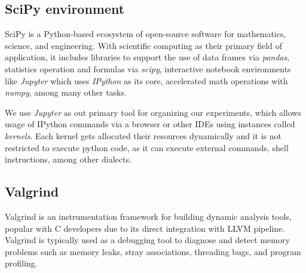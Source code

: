 \subsection{SciPy environment}
SciPy is a Python-based ecosystem of open-source software for mathematics, science, and engineering. With scientific computing as their primary field of application, it includes libraries to support the use of data frames via \textit{pandas}, statistics operation and formulas via \textit{scipy}, interactive notebook environments like \textit{Jupyter} which uses \textit{IPython} as its core, accelerated math operations with \textit{numpy}, among many other tasks. 

We use \textit{Jupyter} as out primary tool for organizing our experiments, which allows usage of IPython commands via a browser or other IDEs using instances called \textit{kernels}. Each kernel gets allocated their resources dynamically and it is not restricted to execute python code, as it can execute external commands, shell instructions, among other dialects. 

\subsection{Valgrind}
Valgrind is an instrumentation framework for building dynamic analysis tools, popular with C developers due to its direct integration with LLVM pipeline. Valgrind is typically used as a debugging tool to diagnose and detect memory problems such as memory leaks, stray associations, threading bugs, and program profiling.
